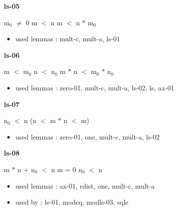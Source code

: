 \documentclass[a4paper]{article}
\begin{document}
\medskip

\bigskip

{\large\bf ls-05}

\medskip

 \Fol $\mbox{m}_{0}$ $\neq$ 0 \And m $<$ n \Imp m $<$ n $*$ $\mbox{m}_{0}$

\begin{itemize}


\item       used lemmas  : mult-c, mult-a, ls-01

\end{itemize}

\medskip

\bigskip

{\large\bf ls-06}

\medskip

 \Fol m $<$ $\mbox{m}_{0}$ \And n $<$ $\mbox{n}_{0}$ \Imp m $*$ n $<$ $\mbox{m}_{0}$ $*$ $\mbox{n}_{0}$

\begin{itemize}


\item       used lemmas  : zero-01, mult-c, mult-a, ls-02, ls, ax-01

\end{itemize}

\medskip

\bigskip

{\large\bf ls-07}

\medskip

 \Fol $\mbox{n}_{0}$ $<$ n \Imp (n $<$ m $*$ n  $<$ m)

\begin{itemize}


\item       used lemmas  : zero-01, one, mult-c, mult-a, ls-02

\end{itemize}

\medskip

\bigskip

{\large\bf ls-08}

\medskip

 \Fol m $*$ n + $\mbox{n}_{0}$ $<$ n \Equiv m = 0 \And $\mbox{n}_{0}$ $<$ n

\begin{itemize}


\item       used lemmas  : ax-01, rdist, one, mult-c, mult-a
\item       used by      : le-01, modeq, modls-03, sqle

\end{itemize}
\end{document}
